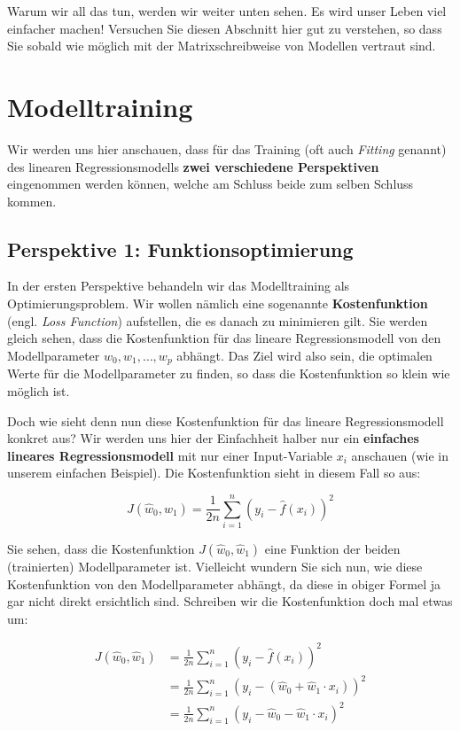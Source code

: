 \documentclass[
]{book}
\begin{document}
Warum wir all das tun, werden wir weiter unten sehen. Es wird unser Leben viel einfacher machen! Versuchen Sie diesen Abschnitt hier gut zu verstehen, so dass Sie sobald wie möglich mit der Matrixschreibweise von Modellen vertraut sind.

\hypertarget{modelltraining}{%
\section{Modelltraining}\label{modelltraining}}

Wir werden uns hier anschauen, dass für das Training (oft auch \emph{Fitting} genannt) des linearen Regressionsmodells \textbf{zwei verschiedene Perspektiven} eingenommen werden können, welche am Schluss beide zum selben Schluss kommen.

\hypertarget{perspektive-1-funktionsoptimierung}{%
\subsection{Perspektive 1: Funktionsoptimierung}\label{perspektive-1-funktionsoptimierung}}

In der ersten Perspektive behandeln wir das Modelltraining als Optimierungsproblem. Wir wollen nämlich eine sogenannte \textbf{Kostenfunktion} (engl. \emph{Loss Function}) aufstellen, die es danach zu minimieren gilt. Sie werden gleich sehen, dass die Kostenfunktion für das lineare Regressionsmodell von den Modellparameter \(w_0,w_1,\dots,w_p\) abhängt. Das Ziel wird also sein, die optimalen Werte für die Modellparameter zu finden, so dass die Kostenfunktion so klein wie möglich ist.

Doch wie sieht denn nun diese Kostenfunktion für das lineare Regressionsmodell konkret aus? Wir werden uns hier der Einfachheit halber nur ein \textbf{einfaches lineares Regressionsmodell} mit nur einer Input-Variable \(x_i\) anschauen (wie in unserem einfachen Beispiel). Die Kostenfunktion sieht in diesem Fall so aus:

\[
J(\hat{w}_0,\hat{w}_1) = \frac{1}{2n} \sum_{i=1}^{n} \left(y_i - \hat{f}(x_i) \right)^2
\]

Sie sehen, dass die Kostenfunktion \(J(\hat{w}_0,\hat{w}_1)\) eine Funktion der beiden (trainierten) Modellparameter ist. Vielleicht wundern Sie sich nun, wie diese Kostenfunktion von den Modellparameter abhängt, da diese in obiger Formel ja gar nicht direkt ersichtlich sind. Schreiben wir die Kostenfunktion doch mal etwas um:

\begin{align}
J(\hat{w}_0, \hat{w}_1) &= \frac{1}{2n} \sum_{i=1}^{n} \left(y_i - \hat{f}(x_i) \right)^2 \\
&= \frac{1}{2n} \sum_{i=1}^{n} \left(y_i - (\hat{w}_0 + \hat{w}_1 \cdot x_i) \right)^2 \\
&= \frac{1}{2n} \sum_{i=1}^{n} \left(y_i - \hat{w}_0 - \hat{w}_1 \cdot x_i \right)^2 \\
\end{align}
\end{document}
